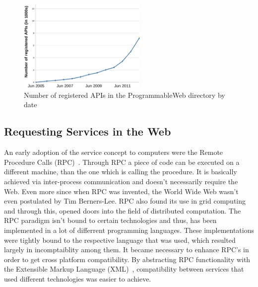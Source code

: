 \begin{figure}[!ht]
  \centering
  \includegraphics[width=0.55\textwidth]{figures/NumOfAPIs}
  \caption{Number of registered APIs in the ProgrammableWeb directory by date}
  \label{fig:NumOfAPIs}
\end{figure}


\subsection{Requesting Services in the Web}
An early adoption of the service concept to computers were the Remote Procedure Calls (\textrm{RPC})~\cite{Birrell:1984:IRP:2080.357392}.
Through \textrm{RPC} a piece of code can be executed on a different machine, than the one which is calling the procedure.
It is basically achieved via inter-process communication and doesn't necessarily require the Web.
Even more since when \textrm{RPC} was invented, the \textrm{World Wide Web} wasn't even postulated by Tim Berners-Lee. 
\textrm{RPC} also found its use in grid computing~\cite{seymour2002overview} and through this, opened doors into the field of distributed computation.
The \textrm{RPC} paradigm isn't bound to certain technologies and thus, has been implemented in a lot of differrent programming languages.
These implementations were tightly bound to the respective language that was used, which resulted largely in incomptaiblity among them.
It became necessary to enhance \textrm{RPC}'s in order to get cross platform compatibility.
By abstracting \textrm{RPC} functionality with the Extensible Markup Language (\textrm{XML})~\cite{bray1998extensible}, compatibility between services that used different technologies was easier to achieve.

